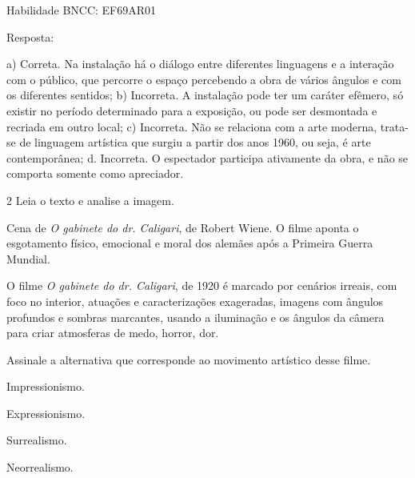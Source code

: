 \begin{escolha}
{Habilidade BNCC: EF69AR01

Resposta:

a) Correta. Na instalação há o diálogo entre diferentes linguagens e a
interação com o público, que percorre o espaço percebendo a obra de
vários ângulos e com os diferentes sentidos;
b) Incorreta. A instalação pode ter um caráter efêmero, só existir no
período determinado para a exposição, ou pode ser desmontada e recriada
em outro local;
c) Incorreta. Não se relaciona com a arte moderna, trata-se de linguagem
artística que surgiu a partir dos anos 1960, ou seja, é arte
contemporânea;
d. Incorreta. O espectador participa ativamente da obra, e não se
comporta somente como apreciador.}

\num{2} Leia o texto e analise a imagem.


Cena de \emph{O gabinete do dr. Caligari}, de Robert Wiene. O filme
aponta o esgotamento físico, emocional e moral dos alemães após a
Primeira Guerra Mundial.


O filme \emph{O gabinete do dr. Caligari}, de 1920 é marcado por
cenários irreais, com foco no interior, atuações e caracterizações
exageradas, imagens com ângulos profundos e sombras marcantes, usando a
iluminação e os ângulos da câmera para criar atmosferas de medo, horror,
dor.

Assinale a alternativa que corresponde ao movimento artístico desse
filme.

\begin{escolha}
\item
  Impressionismo.
\item
  Expressionismo.
\item
  Surrealismo.
\item
  Neorrealismo.
\end{escolha}

\end{escolha}
